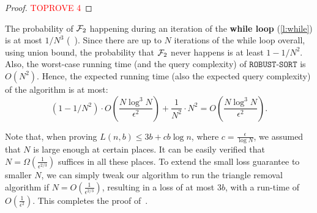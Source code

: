 \documentclass[11pt]{llncs}
\newcommand{\RS}{{\texttt{ROBUST-SORT}}}
\begin{document}
\begin{proof}\textcolor{red}{TOPROVE 4}\end{proof}

The probability of ${\cal F}_2$ happening during an iteration of the {\bf while loop} (\ref{l:while}) is at most $1/N^3$ (~). Since there are up to $N$ iterations of the while loop overall, using union bound, the probability that ${\cal F}_2$ never happens is at least $1 - 1/N^2$. Also, the worst-case running time (and the query complexity) of $\RS$ is $O(N^2)$. Hence, the expected running time (also the expected query complexity) of the algorithm is at most:
$$\left(1-1/N^2\right) \cdot O\left(\frac{N \log^3 N}{\epsilon^2}\right) + \frac{1}{N^2} \cdot N^2 = O\left(\frac{N \log^3 N}{\epsilon^2}\right).$$

Note that, when proving $L(n, b) \le 3b + cb \log n$, where $c = \frac{\epsilon}{\log N}$, we assumed that $N$ is large enough at certain places. It can be easily verified that $N = \Omega (\frac{1}{\epsilon^{2/3}})$ suffices in all these places. To extend the small loss guarantee to smaller $N$, we can simply tweak our algorithm to run the triangle removal algorithm if $N = O(\frac{1}{\epsilon^{2/3}})$, resulting in a loss of at most $3 b$, with a run-time of $O(\frac{1}{\epsilon^2})$.
This completes the proof of~. 
\end{document}
